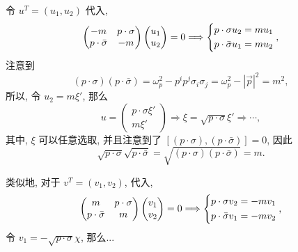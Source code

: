 \begin{itemize}
	\begin{tcolorbox}[title=proof:]
		令 $u^T = (u_1, u_2)$ 代入,
		\begin{equation}
			\begin{pmatrix}
				- m & p \cdot \sigma \\
				p \cdot \bar{\sigma} & - m
			\end{pmatrix} \begin{pmatrix}
				u_1 \\
				u_2
			\end{pmatrix} = 0 \Longrightarrow \begin{dcases}
				p \cdot \sigma u_2 = m u_1 \\
				p \cdot \bar{\sigma} u_1 = m u_2
			\end{dcases},
		\end{equation}
		注意到
		\begin{equation}
			(p \cdot \sigma) (p \cdot \bar{\sigma}) = \omega_p^2 - p^i p^j \sigma_i \sigma_j = \omega_p^2 - |\vec{p}|^2 = m^2,
		\end{equation}
		所以, 令 $u_2 = m \xi'$, 那么
		\begin{equation}
			u = \begin{pmatrix}
				p \cdot \sigma \xi' \\
				m \xi'
			\end{pmatrix} \Longrightarrow \xi = \sqrt{p \cdot \sigma} \xi' \Longrightarrow \cdots,
		\end{equation}
		其中, $\xi$ 可以任意选取, 并且注意到了 $[(p \cdot \sigma), (p \cdot \bar{\sigma})] = 0$, 因此
		\begin{equation}
			\sqrt{p \cdot \sigma} \sqrt{p \cdot \bar{\sigma}} = \sqrt{(p \cdot \sigma) (p \cdot \bar{\sigma})} = m.
		\end{equation}
		
		\noindent\hdashrule[0.5ex]{\linewidth}{0.5pt}{1mm} %
		
		类似地, 对于 $v^T = (v_1, v_2)$, 代入,
		\begin{equation}
			\begin{pmatrix}
				m & p \cdot \sigma \\
				p \cdot \bar{\sigma} & m
			\end{pmatrix} \begin{pmatrix}
				v_1 \\
				v_2
			\end{pmatrix} = 0 \Longrightarrow \begin{dcases}
				p \cdot \sigma v_2 = - m v_1 \\
				p \cdot \bar{\sigma} v_1 = - m v_2
			\end{dcases},
		\end{equation}
		令 $v_1 = - \sqrt{p \cdot \sigma} \chi$, 那么...
		

\end{tcolorbox}
\end{itemize}
